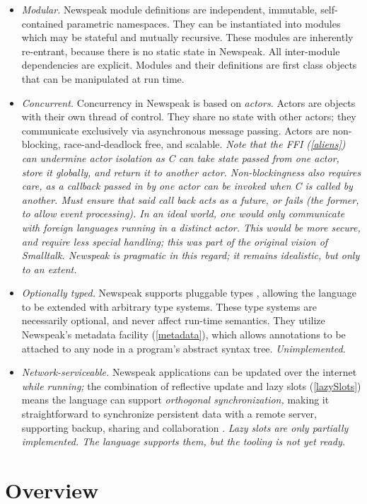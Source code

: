 \documentclass{article}
\begin{document}
\begin{itemize}
\item  {\em Modular.} Newspeak module definitions are independent, immutable, self-contained parametric namespaces.  They can be instantiated into modules which may be stateful and mutually recursive. These modules are inherently re-entrant, because there is no static state in Newspeak.  All inter-module dependencies are explicit. Modules and their definitions are first class objects that can be manipulated at run time.
\item  {\em Concurrent.}  Concurrency  in Newspeak is based on {\em actors.} Actors are objects with their own thread of control. They share no state with other actors; they communicate exclusively via asynchronous message passing. Actors are non-blocking, race-and-deadlock free, and scalable.
{\it Note that the FFI (\ref{aliens}) can undermine actor isolation as C can take state passed from one actor, store it globally, and return it to another actor. Non-blockingness also requires care, as a callback passed in by one actor can be invoked when C is called by another. Must ensure that said call back acts as a future, or  fails (the former, to allow event processing). In an ideal world, one would only communicate with foreign languages running in a distinct actor. This would be more secure, and require less special handling; this was part of the original vision of Smalltalk.  Newspeak is pragmatic in this regard; it remains idealistic, but only to an extent.
}
\item  {\em Optionally typed.} Newspeak supports pluggable types \cite{bracha04b}, allowing the language to be extended with arbitrary type systems.  These type systems are necessarily optional, and never affect run-time semantics. They utilize Newspeak's metadata facility (\ref{metadata}), which allows annotations to be attached to any node in a program's abstract syntax tree.
{\it Unimplemented.}
\item  {\em Network-serviceable.} Newspeak applications can be updated over the internet {\em while running;} the combination of reflective update and lazy slots (\ref{lazySlots}) means the language can support {\em orthogonal synchronization, } making it straightforward to synchronize persistent data with a remote server, supporting backup, sharing and collaboration \cite{bracha05}.
{\it
Lazy slots are only partially implemented. The language supports them, but the tooling is not yet ready.
}
\end{itemize}

\section{Overview}
\end{document}

